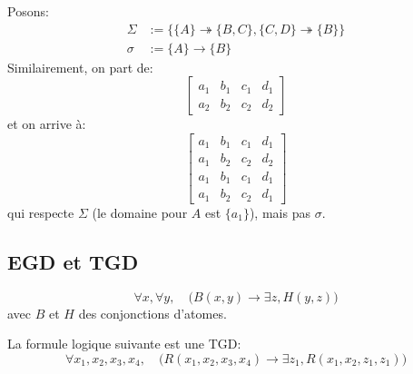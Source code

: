 \documentclass[french, toc]{../cs-classes/cs-classes}
\begin{document}
\begin{exemple}
    Posons:
    \begin{equation*}
        \begin{aligned}
            \Sigma &:= \{\{A\}\twoheadrightarrow\{B, C\}, \{C, D\}\twoheadrightarrow\{B\}\}\\
            \sigma &:= \{A\} \rightarrow \{B\}
        \end{aligned}
    \end{equation*}
    Similairement, on part de:
    \begin{equation*}
        \begin{bmatrix}
            a_1&b_1&c_1&d_1\\
            a_2&b_2&c_2&d_2
        \end{bmatrix}
    \end{equation*}
    et on arrive à:
    \begin{equation*}
        \begin{bmatrix}
            a_1&b_1&c_1&d_1\\
            a_1&b_2&c_2&d_2\\
            a_1&b_1&c_1&d_1\\
            a_1&b_2&c_2&d_1
        \end{bmatrix}
    \end{equation*}
    qui respecte $\Sigma$ (le domaine pour $A$ est $\{a_1\}$), mais pas $\sigma$.
\end{exemple}

\subsection{EGD et TGD}
\begin{definition}
    \begin{equation*}
        \forall x, \forall y, \quad \big(B(x, y) \rightarrow \exists z, H(y, z)\big)
    \end{equation*}
    avec $B$ et $H$ des conjonctions d'atomes.
\end{definition}

\begin{exemple}
    La formule logique suivante est une TGD:
    \begin{equation*}
        \forall x_1, x_2, x_3, x_4, \quad \big(R(x_1, x_2, x_3, x_4) \rightarrow \exists z_1, R(x_1, x_2, z_1, z_1)\big)
    \end{equation*}
\end{exemple}
\end{document}
